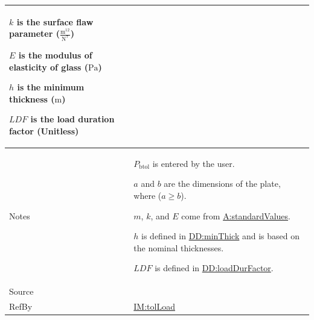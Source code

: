 \documentclass[12pt]{article}
\begin{document}
\begin{minipage}{\textwidth}
\begin{tabular}{>{\raggedright}p{}>{\raggedright\arraybackslash}p{}}
\begin{symbDescription}
              \item{$k$ is the surface flaw parameter ($\frac{\text{m}^{12}}{\text{N}^{7}}$)}
              \item{$E$ is the modulus of elasticity of glass (${\text{Pa}}$)}
              \item{$h$ is the minimum thickness (${\text{m}}$)}
              \item{$\mathit{LDF}$ is the load duration factor (Unitless)}
              \end{symbDescription}
\\ \midrule
Notes & ${P_{\text{b}\text{tol}}}$ is entered by the user.
        
        $a$ and $b$ are the dimensions of the plate, where ($a\geq{}b$).
        
        $m$, $k$, and $E$ come from \hyperref[assumpSV]{A:standardValues}.
        
        $h$ is defined in \hyperref[DD:minThick]{DD:minThick} and is based on the nominal thicknesses.
        
        $\mathit{LDF}$ is defined in \hyperref[DD:loadDurFactor]{DD:loadDurFactor}.
        
\\ \midrule
Source & \cite{astm2009}
         
\\ \midrule
RefBy & \hyperref[IM:tolLoad]{IM:tolLoad}
        
\\ \bottomrule
\end{tabular}
\end{minipage}
\end{document}
